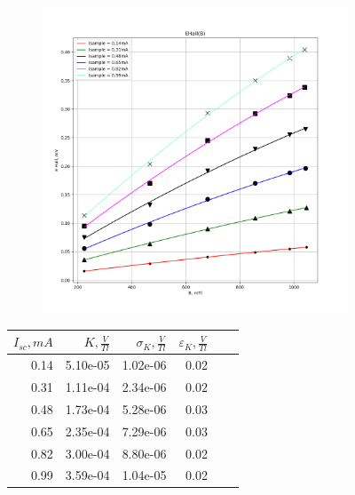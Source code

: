 \documentclass[a4paper, 12pt]{article}
\begin{document}
\begin{figure}[H]
    \centering
    \begin{subfigure}{1.\textwidth}
        \centering
        \includegraphics[width=1.\textwidth]{img/eHall(B).png}
    \end{subfigure}
\end{figure}

\begin{figure}[H]
    \centering
    \begin{tabular}{|r|r|r|r|r|r|}
        \toprule
        $I_{sc}, mA$ & $K, \frac{V}{Tl}$ & $\sigma_K, \frac{V}{Tl}$ & $\varepsilon_K, \frac{V}{Tl}$ \\
        \midrule
        0.14 & 5.10e-05 & 1.02e-06 & 0.02 \\
        0.31 & 1.11e-04 & 2.34e-06 & 0.02 \\
        0.48 & 1.73e-04 & 5.28e-06 & 0.03 \\
        0.65 & 2.35e-04 & 7.29e-06 & 0.03 \\
        0.82 & 3.00e-04 & 8.80e-06 & 0.02 \\
        0.99 & 3.59e-04 & 1.04e-05 & 0.02 \\
        \bottomrule
    \end{tabular}
\end{figure}
\end{document}
